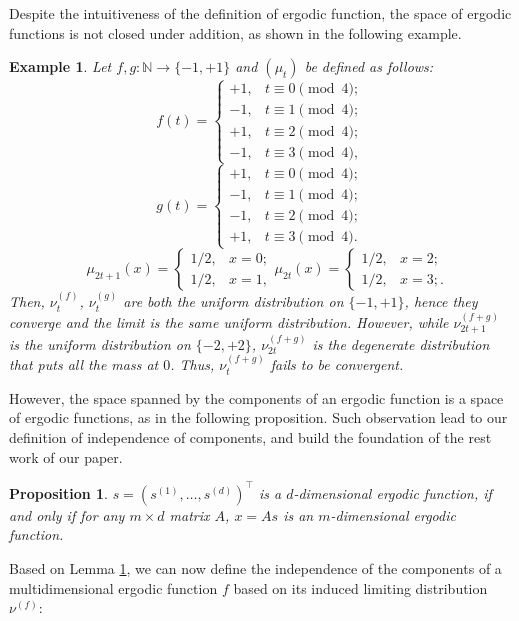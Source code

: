 \documentclass[twoside]{article}
\renewcommand{\natural}{\mathbb{N}}
\newtheorem{example}[lemma]{Example}
\newtheorem{prop}[lemma]{Proposition}
\theoremstyle{definition}
\begin{document}
Despite the intuitiveness of the definition of ergodic function, the space of ergodic functions is not closed under addition, as shown in the following example.
\begin{example}
Let $f,g:\natural \rightarrow \{-1,+1\}$ and $(\mu_t)$ be defined as follows: 
\[
f(t) = \begin{cases} +1, & t \equiv 0 \pmod 4; \\
					-1, & t \equiv 1 \pmod 4; \\
					+1,  & t \equiv 2  \pmod 4; \\
					-1, & t \equiv 3  \pmod 4,
					\end{cases}
					\]\[
g(t) = \begin{cases} +1, & t\equiv 0 \pmod 4; \\
					-1, & t\equiv 1 \pmod 4; \\
					-1,  & t\equiv 2 \pmod 4; \\
					+1, & t\equiv 3 \pmod 4.
					\end{cases}
\]
\[
\quad \mu_{2t+1}(x) = \begin{cases} 1/2, & x=0; \\
					1/2, & x=1, 
					\end{cases}
\mu_{2t}(x) = \begin{cases} 1/2, & x=2; \\
					1/2, & x=3;.
					\end{cases}
\]
Then, $\nu^{(f)}_t$, $\nu^{(g)}_t$ are both the uniform  distribution on $\{-1,+1\}$, hence they converge and the limit is the same uniform  distribution. 
However, while $\nu^{(f+g)}_{2t+1}$ is the uniform  distribution on $\{-2,+2\}$,  $\nu^{(f+g)}_{2t}$ is the degenerate
distribution that puts all the mass at $0$. Thus, $\nu^{(f+g)}_{t}$ fails to be convergent. 
\end{example}
However, the space spanned by the components of an ergodic function is a space of ergodic functions, as in the following proposition. 
Such observation lead to our definition of independence of components, and build the foundation of the rest work of our paper.
\begin{prop}\label{prop:comp}
$s = (s^{(1)},\ldots, s^{(d)})^{\top}$ is a $d$-dimensional ergodic function, if and only if 
 for any $m\times d$ matrix $A$, $x = A s$ is an $m$-dimensional ergodic function.
\end{prop}  
Based on Lemma \ref{prop:comp}, we can now define the independence of the components of a multidimensional ergodic function $f$ based on its induced limiting distribution $\nu^{(f)}$:
\end{document}
